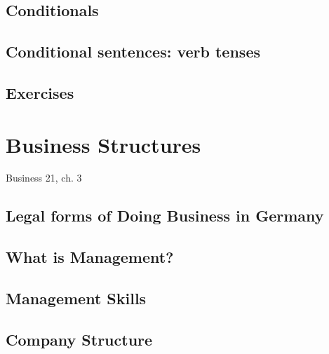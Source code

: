 \section{Conditionals}

\section{Conditional sentences: verb tenses}

\section{Exercises}



\chapter{Business Structures}
Business 21, ch. 3
\section{Legal forms of Doing Business in Germany}



\section{What is Management?}
\section{Management Skills}
\section{Company Structure}
